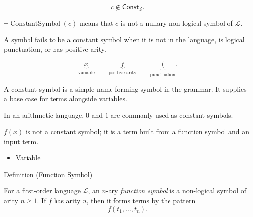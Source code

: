 \begin{remark*}
\[
c\notin\mathsf{Const}_{\mathcal L}.
\]
\end{remark*}

\begin{remark*}
\(\neg\operatorname{ConstantSymbol}(c)\) means that \(c\) is not a nullary
non-logical symbol of \(\mathcal L\).
\end{remark*}

\begin{remark*}
A symbol fails to be a constant symbol when it is not in the language, is
logical punctuation, or has positive arity.
\end{remark*}

\begin{remark*}
\[
\underbrace{x}_{\text{variable}}
\qquad
\underbrace{f}_{\text{positive arity}}
\qquad
\underbrace{(}_{\text{punctuation}}.
\]
\end{remark*}

\begin{remark*}[Interpretation]
A constant symbol is a simple name-forming symbol in the grammar. It supplies a
base case for terms alongside variables.
\end{remark*}

\begin{remark*}[Examples]
In an arithmetic language, \(0\) and \(1\) are commonly used as constant
symbols.
\end{remark*}

\begin{remark*}
\(f(x)\) is not a constant symbol; it is a term built from a function symbol
and an input term.
\end{remark*}

\begin{dependencies}
\begin{itemize}
  \item \hyperref[def:variable]{Variable}
\end{itemize}
\end{dependencies}

\begin{definitionbox}{Definition (Function Symbol)}
\begin{definition}
\label{def:function-symbol}
For a first-order language \(\mathcal L\), an \(n\)-ary \emph{function symbol}
is a non-logical symbol of arity \(n\geq 1\). If \(f\) has arity \(n\), then it
forms terms by the pattern
\[
f(t_1,\ldots,t_n).
\]
\end{definition}
\end{definitionbox}

